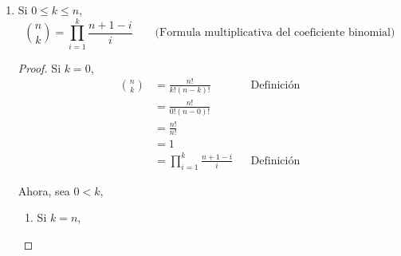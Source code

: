 \begin{enumerate}[label=\alph*)]
\begin{proof}
\begin{enumerate}[label=\Roman*)]
\begin{enumerate}[label=\roman*)]
        \item Supongamos que se cumple para $k\in \N$, es decir, suponemos que \[k! = \prod_{i=1}^k k+1-i\]
        \item Notemos que
        \begin{align*}
          (k+1)! &= (k+1) \cdot k! && \text{Recurrencia del factorial}\\
          &= (k+1) \cdot \prod_{i=1}^k (k+1-i) && \text{Hip. Ind.}\\
          &= (k+1)\cdot \prod_{i=1+1}^{k+1} \Bigl((k+1)-(i-1)\Bigr) && \text{Cambio de índice}\\
          &= (k+1) \cdot \prod_{i=1+1}^{k+1} \Big((k+1)+1-i\Big) \\
          &= \prod_{i=1}^1 \Big((k+1)+1-i\Big) \cdot \prod_{i=1+1}^{k+1} \Big((k+1)+1-i\Big) && \text{Índices iguales del productorio}\\
          &= \prod_{i=1}^{k+1} \Big((k+1)+1-i\Big) && \text{Partir el producto}\\
        \end{align*}
      \end{enumerate}
    \end{enumerate}
  \end{proof}
  
  \item Si $0\leq k \leq n$, \[\binom{n}{k} = \prod_{i=1}^{k} \frac{n+1-i}{i} \qquad \text{(Formula multiplicativa del coeficiente binomial)}\]
  
  \begin{proof}\leavevmode
    
    
    
    Si $k=0$,
        \begin{align*}
          \binom{n}{k} &= \frac{n!}{k!(n-k)!} && \text{Definición}\\
          &= \frac{n!}{0!(n-0)!}\\
          &= \frac{n!}{n!}\\
          &= 1\\
          &= \prod_{i=1}^{k} \frac{n+1-i}{i} && \text{Definición}
        \end{align*}
        
    Ahora, sea $0<k$,
         \begin{enumerate}[label=\Roman*)]
          \item Si $k=n$,
          

\end{enumerate}
\end{proof}
\end{enumerate}
